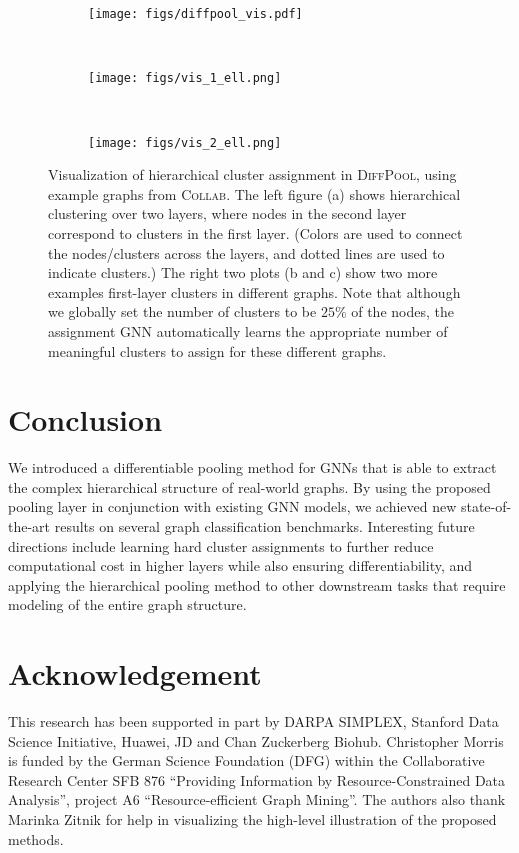 \documentclass{article}
\newcommand{\name}{\textsc{DiffPool}\xspace}
\begin{document}
\begin{figure}[t!]
    \centering
    \begin{subfigure}[b]{0.45\textwidth}
        \centering
        \texttt{[image: figs/diffpool\_vis.pdf]}
        \caption{}
    \end{subfigure}
    ~
    \begin{subfigure}[b]{0.25\textwidth}
        \centering
        \texttt{[image: figs/vis\_1\_ell.png]}
                \caption{}
    \end{subfigure}~ 
    \begin{subfigure}[b]{0.25\textwidth}
        \centering
        \texttt{[image: figs/vis\_2\_ell.png]}
        \caption{}
    \end{subfigure}
    \caption{Visualization of hierarchical cluster assignment in \name, using example graphs from \textsc{Collab}.
      The left figure (a) shows hierarchical clustering over two layers, where nodes in the second layer correspond to clusters in the first layer. (Colors are used to connect the nodes/clusters across the layers, and dotted lines are used to indicate clusters.)
      The right two plots (b and c) show two more examples first-layer clusters in different graphs. 
      Note that although we globally set the number of clusters to be $25\%$ of the nodes, the assignment GNN automatically learns the appropriate number of meaningful clusters to assign for these different graphs.}
        \label{fig:assignment_vis}
\end{figure}


 \section{Conclusion}

We introduced a differentiable pooling method for GNNs that is able to extract the complex hierarchical structure of real-world graphs. By using the proposed pooling layer in conjunction with existing GNN models, we achieved new state-of-the-art results on several graph classification benchmarks. 
Interesting future directions include learning hard cluster assignments to further reduce computational cost in higher layers while also ensuring differentiability, and applying the hierarchical pooling method to other downstream tasks that require modeling of the entire graph structure.


\section*{Acknowledgement}
This research has been supported in part by DARPA SIMPLEX, Stanford Data
Science Initiative, Huawei, JD and Chan Zuckerberg Biohub.
Christopher Morris is funded by the German Science Foundation (DFG) within the Collaborative Research Center SFB 876 “Providing Information by Resource-Constrained Data Analysis”, project A6 “Resource-efficient Graph Mining”. 
The authors also thank Marinka Zitnik for help in visualizing the high-level illustration of the proposed methods.




 



\end{document}
